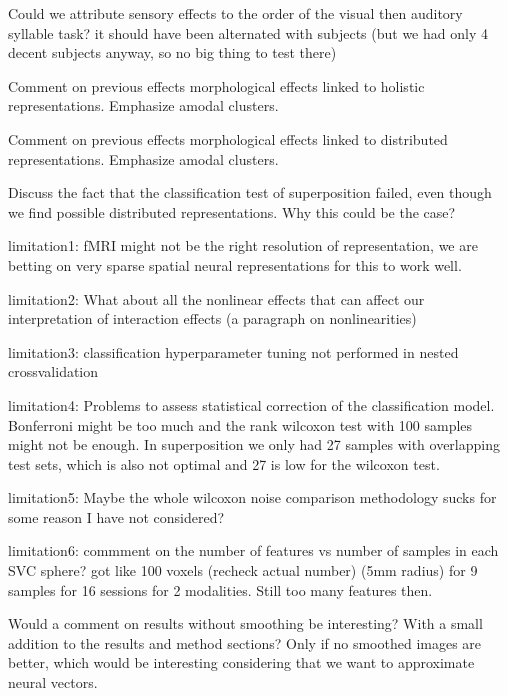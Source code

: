 Could we attribute sensory effects to the order of the visual then auditory syllable task? it should have been alternated with subjects (but we had only 4 decent subjects anyway, so no big thing to test there)

Comment on previous effects morphological effects linked to holistic representations. Emphasize amodal clusters.

Comment on previous effects morphological effects linked to distributed representations. Emphasize amodal clusters.

Discuss the fact that the classification test of superposition failed, even though we find possible distributed representations. Why this could be the case?

limitation1: fMRI might not be the right resolution of representation, we are betting on very sparse spatial neural representations for this to work well.

limitation2: What about all the nonlinear effects that can affect our interpretation of interaction effects (a paragraph on nonlinearities)

limitation3: classification hyperparameter tuning not performed in nested crossvalidation

limitation4: Problems to assess statistical correction of the classification model. Bonferroni might be too much and the rank wilcoxon test with 100 samples might not be enough. In superposition we only had 27 samples with overlapping test sets, which is also not optimal and 27 is low for the wilcoxon test.

limitation5: Maybe the whole wilcoxon noise comparison methodology sucks for some reason I have not considered?

limitation6: commment on the number of features vs number of samples in each SVC sphere? got like 100 voxels (recheck actual number) (5mm radius) for 9 samples for 16 sessions for 2 modalities. Still too many features then.

Would a comment on results without smoothing be interesting? With a small addition to the results and method sections? Only if no smoothed images are better, which would be interesting considering that we want to approximate neural vectors.